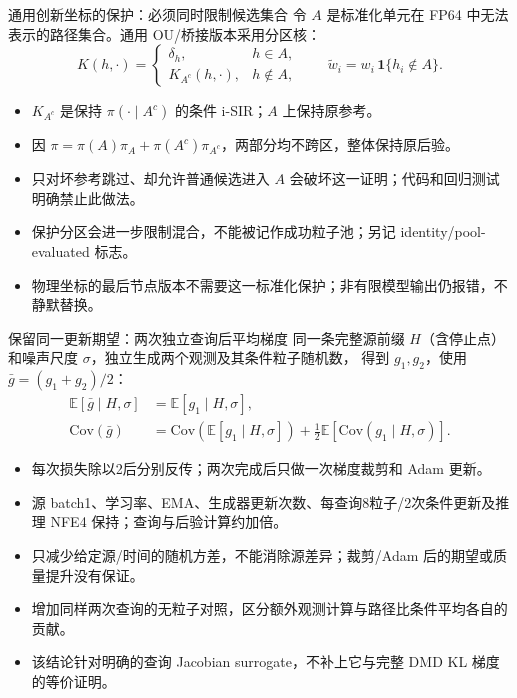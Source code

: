\documentclass[10pt,aspectratio=169]{beamer}
\newcommand{\E}{\mathbb E}
\begin{document}
\begin{frame}{通用创新坐标的保护：必须同时限制候选集合}
\small
令 $A$ 是标准化单元在 FP64 中无法表示的路径集合。通用 OU/桥接版本采用分区核：
\begin{equation}
K(h,\cdot)=\begin{cases}\delta_h,&h\in A,\\
K_{A^c}(h,\cdot),&h\notin A,
\end{cases}\qquad
\widetilde w_i=w_i\,\mathbf1\{h_i\notin A\}.
\end{equation}
\begin{itemize}\itemsep5pt
\item $K_{A^c}$ 是保持 $\pi(\cdot\mid A^c)$ 的条件 i-SIR；$A$ 上保持原参考。
\item 因 $\pi=\pi(A)\pi_A+\pi(A^c)\pi_{A^c}$，两部分均不跨区，整体保持原后验。
\item 只对坏参考跳过、却允许普通候选进入 $A$ 会破坏这一证明；代码和回归测试明确禁止此做法。
\item 保护分区会进一步限制混合，不能被记作成功粒子池；另记 identity/pool-evaluated 标志。
\item 物理坐标的最后节点版本不需要这一标准化保护；非有限模型输出仍报错，不静默替换。
\end{itemize}
\end{frame}

\begin{frame}{保留同一更新期望：两次独立查询后平均梯度}
\small
同一条完整源前缀 $H$（含停止点）和噪声尺度 $\sigma$，独立生成两个观测及其条件粒子随机数，
得到 $g_1,g_2$，使用 $\bar g=(g_1+g_2)/2$：
\begin{align}
\E[\bar g\mid H,\sigma]&=\E[g_1\mid H,\sigma],\\
\mathrm{Cov}(\bar g)&=\mathrm{Cov}(\E[g_1\mid H,\sigma])
+\tfrac12\E[\mathrm{Cov}(g_1\mid H,\sigma)].
\end{align}
\begin{itemize}\itemsep5pt
\item 每次损失除以2后分别反传；两次完成后只做一次梯度裁剪和 Adam 更新。
\item 源 batch1、学习率、EMA、生成器更新次数、每查询8粒子/2次条件更新及推理 NFE4 保持；查询与后验计算约加倍。
\item 只减少给定源/时间的随机方差，不能消除源差异；裁剪/Adam 后的期望或质量提升没有保证。
\item 增加同样两次查询的无粒子对照，区分额外观测计算与路径比条件平均各自的贡献。
\item 该结论针对明确的查询 Jacobian surrogate，不补上它与完整 DMD KL 梯度的等价证明。
\end{itemize}
\end{frame}
\end{document}
